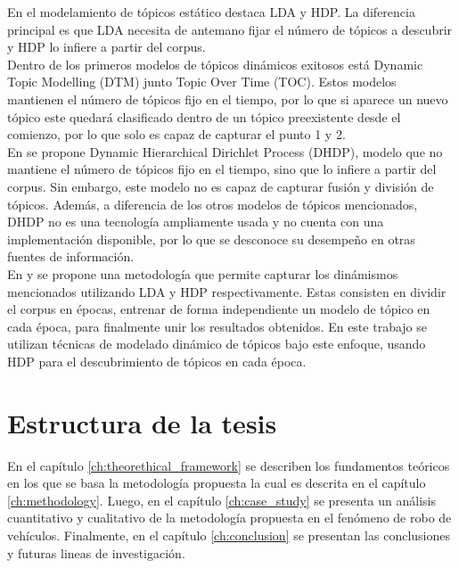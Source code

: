 En el modelamiento de tópicos estático destaca LDA y HDP. La diferencia principal es que LDA necesita de antemano fijar el número de tópicos a descubrir y HDP lo infiere a partir del corpus.\\

Dentro de los primeros modelos de tópicos dinámicos exitosos está Dynamic Topic Modelling (DTM)\citep{blei2006dynamic} junto Topic Over Time (TOC)\citep{wang2006topics}. Estos modelos mantienen el número de tópicos fijo en el tiempo, por lo que si aparece un nuevo tópico este quedará clasificado dentro de un tópico preexistente desde el comienzo, por lo que solo es capaz de capturar el punto 1 y 2.\\

En \citep{ahmed2012timeline} se propone Dynamic Hierarchical Dirichlet Process (DHDP), modelo que no mantiene el número de tópicos fijo en el tiempo, sino que lo infiere a partir del corpus. Sin embargo, este modelo no es capaz de capturar fusión y división de tópicos. Además, a diferencia de los otros modelos de tópicos mencionados, DHDP no es una tecnología ampliamente usada y no cuenta con una implementación disponible, por lo que se desconoce su desempeño en otras fuentes de información.\\

En \citep{wilson2011tracking} y \citep{beykikhoshk2018discovering} se propone una metodología que permite capturar los dinámismos mencionados utilizando LDA y HDP respectivamente. Estas consisten en dividir el corpus en épocas, entrenar de forma independiente un modelo de tópico en cada época, para finalmente unir los resultados obtenidos. En este trabajo se utilizan técnicas de modelado dinámico de tópicos bajo este enfoque, usando HDP para el descubrimiento de tópicos en cada época.

\section{Estructura de la tesis}
En el capítulo \ref{ch:theorethical_framework} se describen los fundamentos teóricos en los que se basa la metodología propuesta la cual es descrita en el capítulo \ref{ch:methodology}. Luego, en el capítulo \ref{ch:case_study} se presenta un análisis cuantitativo y cualitativo de la metodología propuesta en el fenómeno de robo de vehículos. Finalmente, en el capítulo \ref{ch:conclusion} se presentan las conclusiones y futuras lineas de investigación.
